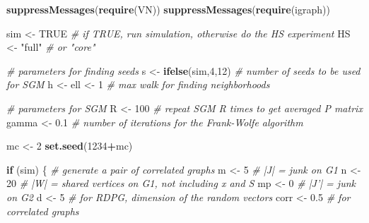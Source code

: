 \documentclass[]{article}
\newenvironment{Shaded}{\begin{snugshade}}{\end{snugshade}}
\newcommand{\KeywordTok}[1]{\textcolor[rgb]{0.13,0.29,0.53}{\textbf{#1}}}
\newcommand{\DecValTok}[1]{\textcolor[rgb]{0.00,0.00,0.81}{#1}}
\newcommand{\FloatTok}[1]{\textcolor[rgb]{0.00,0.00,0.81}{#1}}
\newcommand{\StringTok}[1]{\textcolor[rgb]{0.31,0.60,0.02}{#1}}
\newcommand{\CommentTok}[1]{\textcolor[rgb]{0.56,0.35,0.01}{\textit{#1}}}
\newcommand{\OtherTok}[1]{\textcolor[rgb]{0.56,0.35,0.01}{#1}}
\newcommand{\ControlFlowTok}[1]{\textcolor[rgb]{0.13,0.29,0.53}{\textbf{#1}}}
\newcommand{\OperatorTok}[1]{\textcolor[rgb]{0.81,0.36,0.00}{\textbf{#1}}}
\newcommand{\NormalTok}[1]{#1}
\begin{document}
\begin{Shaded}
\begin{Highlighting}[]
\KeywordTok{suppressMessages}\NormalTok{(}\KeywordTok{require}\NormalTok{(VN)) }
\KeywordTok{suppressMessages}\NormalTok{(}\KeywordTok{require}\NormalTok{(igraph))}

\NormalTok{sim <-}\StringTok{ }\OtherTok{TRUE} \CommentTok{# if TRUE, run simulation, otherwise do the HS experiment}
\NormalTok{HS <-}\StringTok{ "full"} \CommentTok{# or "core"}

\CommentTok{# parameters for finding seeds}
\NormalTok{s <-}\StringTok{ }\KeywordTok{ifelse}\NormalTok{(sim,}\DecValTok{4}\NormalTok{,}\DecValTok{12}\NormalTok{) }\CommentTok{# number of seeds to be used for SGM}
\NormalTok{h <-}\StringTok{ }\NormalTok{ell <-}\StringTok{ }\DecValTok{1} \CommentTok{# max walk for finding neighborhoods}

\CommentTok{# parameters for SGM}
\NormalTok{R <-}\StringTok{ }\DecValTok{100}     \CommentTok{# repeat SGM R times to get averaged P matrix}
\NormalTok{gamma <-}\StringTok{ }\FloatTok{0.1} \CommentTok{# number of iterations for the Frank-Wolfe algorithm}

\NormalTok{mc <-}\StringTok{ }\DecValTok{2}
\KeywordTok{set.seed}\NormalTok{(}\DecValTok{1234}\OperatorTok{+}\NormalTok{mc)}

\ControlFlowTok{if}\NormalTok{ (sim) \{}
    \CommentTok{# generate a pair of correlated graphs}
\NormalTok{    m <-}\StringTok{ }\DecValTok{5}  \CommentTok{# |J| = junk on G1}
\NormalTok{    n <-}\StringTok{ }\DecValTok{20} \CommentTok{# |W| = shared vertices on G1, not including x and S}
\NormalTok{    mp <-}\StringTok{ }\DecValTok{0} \CommentTok{# |J'| = junk on G2 }
\NormalTok{    d <-}\StringTok{ }\DecValTok{5}  \CommentTok{# for RDPG, dimension of the random vectors}
\NormalTok{    corr <-}\StringTok{ }\FloatTok{0.5} \CommentTok{# for correlated graphs}


\end{Highlighting}
\end{Shaded}
\end{document}
